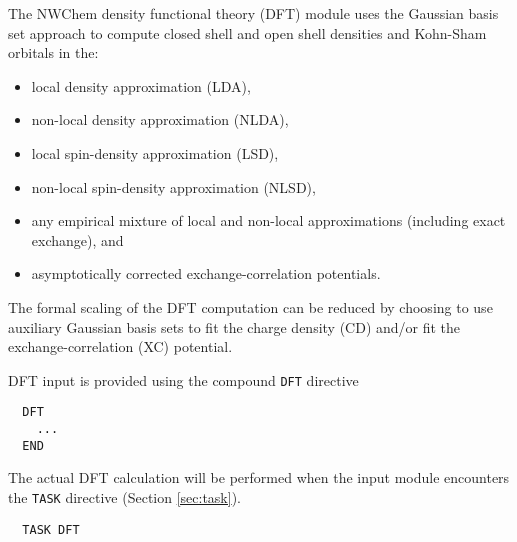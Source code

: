 %
%
\label{sec:dft}

The NWChem density functional theory (DFT) module uses the
Gaussian basis set approach to compute
closed shell and open shell densities and Kohn-Sham orbitals
in the: 
\begin{itemize}
\item local density approximation (LDA), 
\item non-local density approximation (NLDA), 
\item local spin-density approximation (LSD), 
\item non-local spin-density approximation (NLSD),
\item any empirical mixture of local and non-local approximations
(including exact exchange), and
\item asymptotically corrected exchange-correlation potentials.
\end{itemize}

The formal scaling of the DFT computation can be reduced by choosing
to use auxiliary Gaussian basis sets to fit the charge density (CD) and/or 
fit the exchange-correlation (XC) potential.

DFT input is provided using the compound \verb+DFT+ directive
\begin{verbatim}
  DFT
    ...
  END
\end{verbatim}
The actual DFT calculation will be performed when the input module
encounters the \verb+TASK+ directive (Section \ref{sec:task}).  
\begin{verbatim}
  TASK DFT
\end{verbatim}

